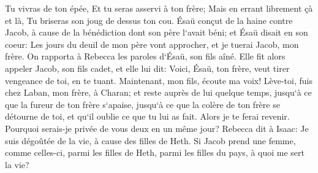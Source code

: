 \verse Tu vivras de ton épée, Et tu seras asservi à ton frère; Mais en errant librement çà et là, Tu briseras son joug de dessus ton cou. 
\verse Ésaü conçut de la haine contre Jacob, à cause de la bénédiction dont son père l`avait béni; et Ésaü disait en son coeur: Les jours du deuil de mon père vont approcher, et je tuerai Jacob, mon frère. 
\verse On rapporta à Rebecca les paroles d`Ésaü, son fils aîné. Elle fit alors appeler Jacob, son fils cadet, et elle lui dit: Voici, Ésaü, ton frère, veut tirer vengeance de toi, en te tuant. 
\verse Maintenant, mon fils, écoute ma voix! Lève-toi, fuis chez Laban, mon frère, à Charan; 
\verse et reste auprès de lui quelque temps, 
\verse jusqu`à ce que la fureur de ton frère s`apaise, jusqu`à ce que la colère de ton frère se détourne de toi, et qu`il oublie ce que tu lui as fait. Alors je te ferai revenir. Pourquoi serais-je privée de vous deux en un même jour? 
\verse Rebecca dit à Isaac: Je suis dégoûtée de la vie, à cause des filles de Heth. Si Jacob prend une femme, comme celles-ci, parmi les filles de Heth, parmi les filles du pays, à quoi me sert la vie? 

